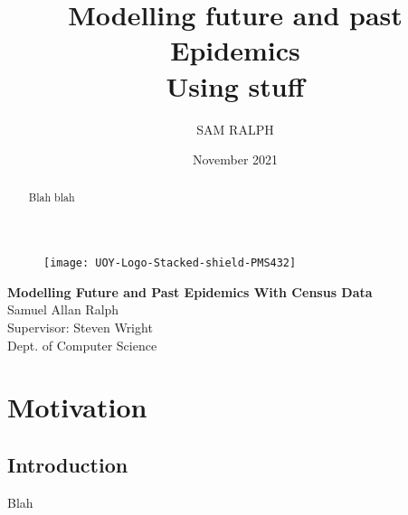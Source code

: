 \documentclass{report}
\title{Modelling future and past Epidemics \\
\large Using stuff
}
\author{SAM RALPH}
\date{November 2021}
\begin{document}
    \begin{titlepage}
        \begin{center}
            \begin{figure}
                \texttt{[image: UOY-Logo-Stacked-shield-PMS432]}
                \label{fig:uoylogo}
            \end{figure}

            \vspace{1.5cm}
            {\huge\bfseries Modelling Future and Past Epidemics With Census Data}\\
            \vspace{3cm}
            {\large Samuel Allan Ralph \\}
            \vspace{4cm}
            Supervisor: Steven Wright \\

            \vspace{1cm}
            Dept. of Computer Science
        \end{center}
    \end{titlepage}
    \tableofcontents
    \clearpage
    \begin{abstract}
        Blah blah
    \end{abstract}

    \clearpage


    \chapter{Motivation}


    \section{Introduction}
    Blah
\end{document}
